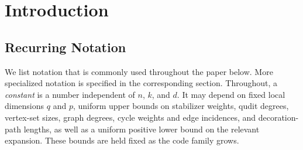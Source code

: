 \documentclass[aps,prx,onecolumn,nofootinbib,11pt,superscriptaddress]{revtex4-2}
\begin{document}
\maketitle

\tableofcontents

\section{Introduction}\label{sec:intro}

\subsection*{Recurring Notation}

We list notation that is commonly used throughout the paper below. More specialized notation is specified in the corresponding section.
Throughout, a \emph{constant} is a number independent of $n$, $k$, and $d$. It may depend on fixed local dimensions $q$ and $p$, uniform upper bounds on stabilizer weights, qudit degrees, vertex-set sizes, graph degrees, cycle weights and edge incidences, and decoration-path lengths, as well as a uniform positive lower bound on the relevant expansion. These bounds are held fixed as the code family grows.
\end{document}
